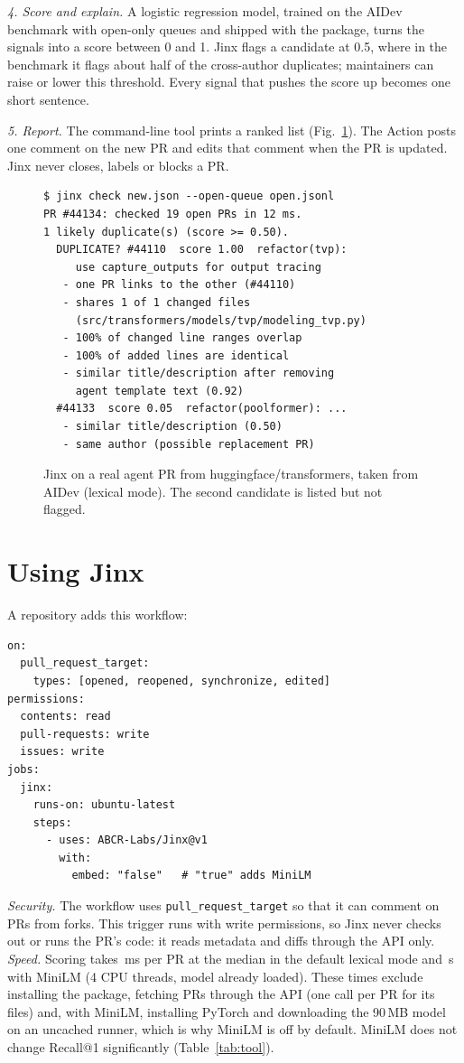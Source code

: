 \documentclass[sigconf]{acmart}
\begin{document}
\emph{4. Score and explain.} A logistic regression model, trained on the AIDev benchmark with open-only queues and shipped with the package, turns the signals into a score between 0 and 1. Jinx flags a candidate at 0.5, where in the benchmark it flags about half of the cross-author duplicates; maintainers can raise or lower this threshold. Every signal that pushes the score up becomes one short sentence.

\emph{5. Report.} The command-line tool prints a ranked list (Fig.~\ref{fig:cli}). The Action posts one comment on the new PR and edits that comment when the PR is updated. Jinx never closes, labels or blocks a PR.

\begin{figure}[t]
\small
\begin{verbatim}
$ jinx check new.json --open-queue open.jsonl
PR #44134: checked 19 open PRs in 12 ms.
1 likely duplicate(s) (score >= 0.50).
  DUPLICATE? #44110  score 1.00  refactor(tvp):
     use capture_outputs for output tracing
   - one PR links to the other (#44110)
   - shares 1 of 1 changed files
     (src/transformers/models/tvp/modeling_tvp.py)
   - 100% of changed line ranges overlap
   - 100% of added lines are identical
   - similar title/description after removing
     agent template text (0.92)
  #44133  score 0.05  refactor(poolformer): ...
   - similar title/description (0.50)
   - same author (possible replacement PR)
\end{verbatim}
\caption{Jinx on a real agent PR from huggingface/transformers, taken from AIDev (lexical mode). The second candidate is listed but not flagged.}\label{fig:cli}\end{figure}

\section{Using Jinx}
A repository adds this workflow:
\begin{verbatim}
on:
  pull_request_target:
    types: [opened, reopened, synchronize, edited]
permissions:
  contents: read
  pull-requests: write
  issues: write
jobs:
  jinx:
    runs-on: ubuntu-latest
    steps:
      - uses: ABCR-Labs/Jinx@v1
        with:
          embed: "false"   # "true" adds MiniLM
\end{verbatim}
\emph{Security.} The workflow uses \texttt{pull\_request\_target} so that it can comment on PRs from forks. This trigger runs with write permissions, so Jinx never checks out or runs the PR's code: it reads metadata and diffs through the API only. \emph{Speed.} Scoring takes \latJinx\,ms per PR at the median in the default lexical mode and \latMini\,s with MiniLM (4 CPU threads, model already loaded). These times exclude installing the package, fetching PRs through the API (one call per PR for its files) and, with MiniLM, installing PyTorch and downloading the 90\,MB model on an uncached runner, which is why MiniLM is off by default. MiniLM does not change Recall@1 significantly (Table~\ref{tab:tool}).
\end{document}
